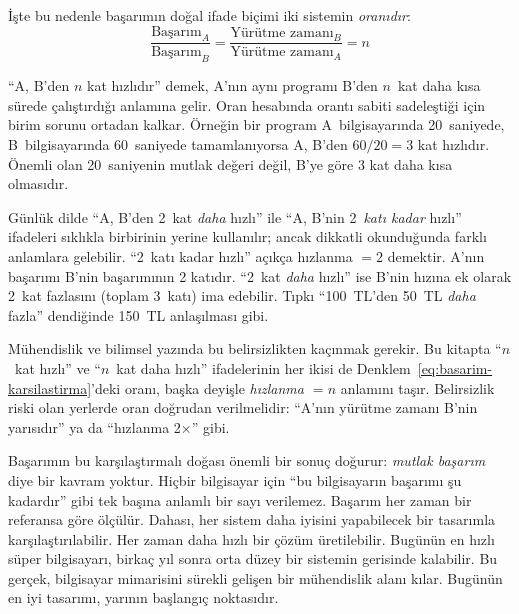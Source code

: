 İşte bu nedenle başarımın doğal ifade biçimi iki sistemin \emph{oranıdır}:
\begin{equation}
\frac{\text{Başarım}_A}{\text{Başarım}_B} = \frac{\text{Yürütme zamanı}_B}{\text{Yürütme zamanı}_A} = n
\label{eq:basarim-karsilastirma}
\end{equation}

\noindent ``A, B'den $n$ kat hızlıdır'' demek, A'nın aynı programı B'den $n$~kat daha kısa sürede çalıştırdığı anlamına gelir. Oran hesabında orantı sabiti sadeleştiği için birim sorunu ortadan kalkar. Örneğin bir program A~bilgisayarında 20~saniyede, B~bilgisayarında 60~saniyede tamamlanıyorsa A, B'den $60/20 = 3$ kat hızlıdır. Önemli olan 20~saniyenin mutlak değeri değil, B'ye göre 3 kat daha kısa olmasıdır.

\begin{bilginot}
Günlük dilde ``A, B'den 2~kat \emph{daha} hızlı'' ile ``A, B'nin 2~\emph{katı kadar} hızlı'' ifadeleri sıklıkla birbirinin yerine kullanılır; ancak dikkatli okunduğunda farklı anlamlara gelebilir. ``2~katı kadar hızlı'' açıkça hızlanma $= 2$ demektir. A'nın başarımı B'nin başarımının 2 katıdır. ``2~kat \emph{daha} hızlı'' ise B'nin hızına ek olarak 2~kat fazlasını (toplam 3~katı) ima edebilir. Tıpkı ``100~TL'den 50~TL \emph{daha} fazla'' dendiğinde 150~TL anlaşılması gibi.

Mühendislik ve bilimsel yazında bu belirsizlikten kaçınmak gerekir. Bu kitapta ``$n$~kat hızlı'' ve ``$n$~kat daha hızlı'' ifadelerinin her ikisi de Denklem~\ref{eq:basarim-karsilastirma}'deki oranı, başka deyişle \emph{hızlanma $= n$} anlamını taşır. Belirsizlik riski olan yerlerde oran doğrudan verilmelidir: ``A'nın yürütme zamanı B'nin yarısıdır'' ya da ``hızlanma 2$\times$'' gibi.
\end{bilginot}

Başarımın bu karşılaştırmalı doğası önemli bir sonuç doğurur: \emph{mutlak başarım} diye bir kavram yoktur. Hiçbir bilgisayar için ``bu bilgisayarın başarımı şu kadardır'' gibi tek başına anlamlı bir sayı verilemez. Başarım her zaman bir referansa göre ölçülür. Dahası, her sistem daha iyisini yapabilecek bir tasarımla karşılaştırılabilir. Her zaman daha hızlı bir çözüm üretilebilir. Bugünün en hızlı süper bilgisayarı, birkaç yıl sonra orta düzey bir sistemin gerisinde kalabilir. Bu gerçek, bilgisayar mimarisini sürekli gelişen bir mühendislik alanı kılar. Bugünün en iyi tasarımı, yarının başlangıç noktasıdır.


